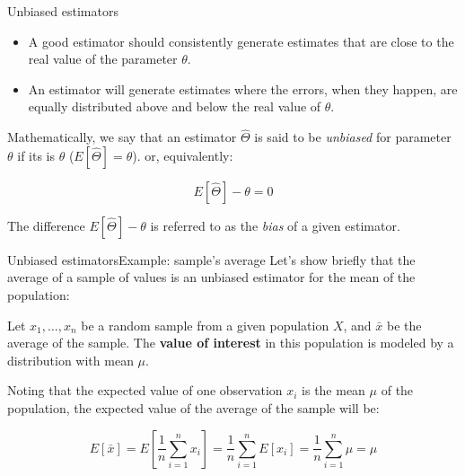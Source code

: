 \begin{frame}{Unbiased estimators}
\begin{itemize}
  \item A good estimator should consistently generate estimates that are close to the real value of the parameter $\theta$.
  \item An  estimator will generate estimates where the errors, when they happen, are equally distributed above and below the real value of $\theta$.
\end{itemize}\bigskip

Mathematically, we say that an estimator $\hat{\Theta}$ is said to be \textit{unbiased} for parameter $\theta$ if its  is $\theta$ ($E\left[\hat\Theta\right] = \theta$). or, equivalently:\bigskip

\begin{equation*}
E\left[\hat{\Theta}\right] - \theta = 0
\end{equation*}\bigskip

The difference $E\left[\hat{\Theta}\right] - \theta$ is referred to as the \textit{bias} of a given estimator.
\end{frame}

\begin{frame}{Unbiased estimators}{Example: sample's average}
Let's show briefly that the average of a sample of values is an unbiased estimator for the mean of the population:\bigskip

Let $x_1,\ldots,x_n$ be a random sample from a given population $X$, and $\bar{x}$ be the average of the sample. The {\bf value of interest} in this population is modeled by a distribution with mean $\mu$.\bigskip

Noting that the expected value of one observation $x_i$ is the mean $\mu$ of the population, the expected value of the average of the sample will be:\bigskip

\begin{equation*}
E\left[\bar{x}\right] = E\left[\frac{1}{n}\sum\limits_{i=1}^{n}x_i\right] =
\frac{1}{n}\sum\limits_{i=1}^{n}E\left[x_i\right] =
\frac{1}{n}\sum\limits_{i=1}^{n}\mu = \mu
\end{equation*}
\vfill
\end{frame}

